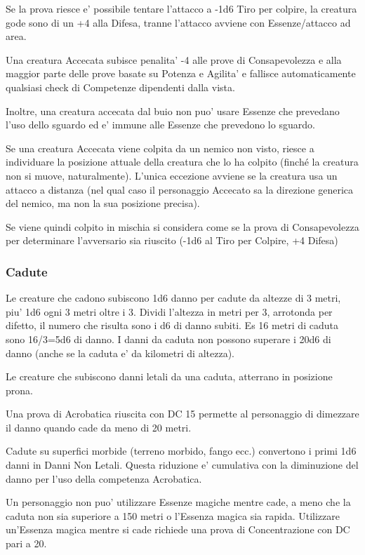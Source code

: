 \documentclass[a4paper,11pt,twoside,openany]{dndbook}
\begin{document}
{Se la prova riesce e' possibile tentare l'attacco a -1d6 Tiro per colpire, la creatura gode sono di un +4 alla Difesa, tranne l'attacco avviene con Essenze/attacco ad area.

Una creatura Accecata subisce penalita' -4 alle prove di Consapevolezza e alla maggior parte delle prove basate su Potenza e Agilita' e fallisce automaticamente qualsiasi check di Competenze dipendenti dalla vista. 

Inoltre, una creatura accecata dal buio non puo' usare Essenze che prevedano l'uso dello sguardo ed e' immune alle Essenze che prevedono lo sguardo.

Se una creatura Accecata viene colpita da un nemico non visto, riesce a individuare la posizione attuale della creatura che lo ha colpito (finché la creatura non si muove, naturalmente). L'unica eccezione avviene se la creatura usa un attacco a distanza (nel qual caso il personaggio Accecato sa la direzione generica del nemico, ma non la sua posizione precisa).

Se viene quindi colpito in mischia si considera come se la prova di Consapevolezza per determinare l'avversario sia riuscito (-1d6 al Tiro per Colpire, +4 Difesa)

\subsubsection{Cadute}

\label{cadute}

Le creature che cadono subiscono 1d6 danno per cadute da altezze di 3 metri, piu' 1d6 ogni 3 metri oltre i 3. Dividi l'altezza in metri per 3, arrotonda per difetto, il numero che risulta sono i d6 di danno subiti. Es 16 metri di caduta sono 16/3=5d6 di danno. I danni da caduta non possono superare i 20d6 di danno (anche se la caduta e' da kilometri di altezza).

Le creature che subiscono danni letali da una caduta, atterrano in posizione prona.

Una prova di Acrobatica riuscita con DC 15 permette al personaggio di dimezzare il danno quando cade da meno di 20 metri.

Cadute su superfici morbide (terreno morbido, fango ecc.) convertono i primi 1d6 danni in Danni Non Letali. Questa riduzione e' cumulativa con la diminuzione del danno per l'uso della competenza Acrobatica.

Un personaggio non puo' utilizzare Essenze magiche mentre cade, a meno che la caduta non sia superiore a 150 metri o l'Essenza magica sia rapida. Utilizzare un'Essenza magica mentre si cade richiede una prova di Concentrazione con DC pari a 20.

}
\end{document}
